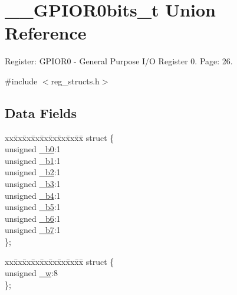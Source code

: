\hypertarget{union_____g_p_i_o_r0bits__t}{\section{\+\_\+\+\_\+\+G\+P\+I\+O\+R0bits\+\_\+t Union Reference}
\label{union_____g_p_i_o_r0bits__t}
}


Register\+: G\+P\+I\+O\+R0 -\/ General Purpose I/\+O Register 0. Page\+: 26.  




{\ttfamily \#include $<$reg\+\_\+structs.\+h$>$}

\subsection*{Data Fields}
\begin{DoxyCompactItemize}
\item 
\begin{tabbing}
xx\=xx\=xx\=xx\=xx\=xx\=xx\=xx\=xx\=\kill
struct \{\\
\>unsigned \hyperlink{union_____g_p_i_o_r0bits__t_ab272f435a6eaca47d0010830e14de174}{\_b0}:1\\
\>unsigned \hyperlink{union_____g_p_i_o_r0bits__t_a8a68c39daf41f54e9d35b07143754709}{\_b1}:1\\
\>unsigned \hyperlink{union_____g_p_i_o_r0bits__t_a6984b5721a28117a67937fe49c856ad8}{\_b2}:1\\
\>unsigned \hyperlink{union_____g_p_i_o_r0bits__t_ad98e3c6f52dae31936f3a4dd33949012}{\_b3}:1\\
\>unsigned \hyperlink{union_____g_p_i_o_r0bits__t_af2305a9c081f35a684b9ac3130037d6e}{\_b4}:1\\
\>unsigned \hyperlink{union_____g_p_i_o_r0bits__t_a4582d599ff06d6e5eb9235b7f0553526}{\_b5}:1\\
\>unsigned \hyperlink{union_____g_p_i_o_r0bits__t_a0913a13ad50ad618da0dc2b56816599f}{\_b6}:1\\
\>unsigned \hyperlink{union_____g_p_i_o_r0bits__t_a3ec4b94a17c19e94ae411bb1ebce54c9}{\_b7}:1\\
\}; \\

\end{tabbing}\item 
\begin{tabbing}
xx\=xx\=xx\=xx\=xx\=xx\=xx\=xx\=xx\=\kill
struct \{\\
\>unsigned \hyperlink{union_____g_p_i_o_r0bits__t_ad64bc463ae2a687840ec4dbf60cbb1e2}{\_w}:8\\
\}; \\

\end{tabbing}\end{DoxyCompactItemize}


